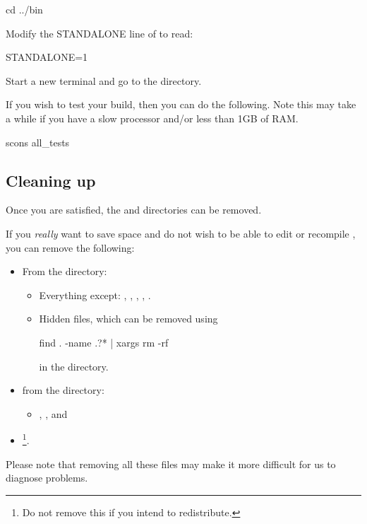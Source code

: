 \begin{shellCode}
cd ../bin
\end{shellCode}

Modify the STANDALONE line of  to read:
 
STANDALONE=1

Start a new terminal and go to the  directory.


If you wish to test your build, then you can do the following. 
Note this may take a while if you have a slow processor and/or less than 1GB of RAM.
\begin{shellCode}
scons all_tests
\end{shellCode}

\subsection{Cleaning up}
Once you are satisfied, the  and  directories can be removed.

If you \emph{really} want to save space and do not wish to be able to edit or recompile \esfinley, you can remove the following:
\begin{itemize}
 \item From the  directory:\begin{itemize}
\item Everything except: , , , ,
.
\item Hidden files, which can be removed using
\begin{shellCode}
find . -name .?* | xargs rm -rf
\end{shellCode}
in the  directory.
\end{itemize}
\item from the  directory:
\begin{itemize}
\item  {}, ,  and 
\end{itemize}
\item {}\footnote{Do not remove this if you intend to redistribute.}.
\end{itemize}

Please note that removing all these files may make it more difficult for us to diagnose problems.


